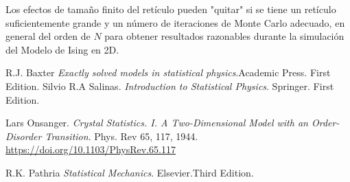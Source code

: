 \documentclass[a4paper]{article}
\begin{document}
Los efectos de tamaño finito del retículo pueden "quitar" si se tiene un retículo suficientemente grande y un número de iteraciones de Monte Carlo adecuado, en general del orden de $N$ para obtener resultados razonables durante la simulación del Modelo de Ising en 2D.
\begin{thebibliography}{99}


R.J. Baxter \textit{Exactly solved models in statistical physics}.Academic Press. First Edition.
Silvio R.A Salinas. \textit{Introduction to Statistical Physics}. Springer. First Edition.

 Lars Onsanger. \textit{Crystal Statistics. I. A Two-Dimensional Model with an Order-Disorder Transition}. Phys. Rev 65, 117, 1944. \url{https://doi.org/10.1103/PhysRev.65.117}

R.K. Pathria \textit{Statistical Mechanics}. Elsevier.Third Edition.






\end{thebibliography}
\end{document}
